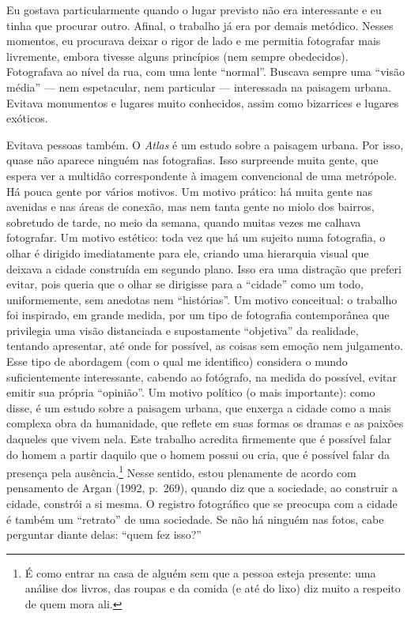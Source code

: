 Eu gostava particularmente quando o lugar previsto não era interessante
e eu tinha que procurar outro. Afinal, o trabalho já era por demais
metódico. Nesses momentos, eu procurava deixar o rigor de lado e me
permitia fotografar mais livremente, embora tivesse alguns princípios
(nem sempre obedecidos). Fotografava ao nível da rua, com uma lente
``normal''. Buscava sempre uma ``visão média'' --- nem espetacular, nem
particular --- interessada na paisagem urbana. Evitava monumentos e lugares
muito conhecidos, assim como bizarrices e lugares exóticos.

Evitava pessoas também. O \emph{Atlas} é um estudo sobre a paisagem
urbana. Por isso, quase não aparece ninguém nas fotografias. Isso
surpreende muita gente, que espera ver a multidão correspondente à
imagem convencional de uma metrópole. Há pouca gente por vários motivos.
Um motivo prático: há muita gente nas avenidas e nas áreas de conexão,
mas nem tanta gente no miolo dos bairros, sobretudo de tarde, no meio da
semana, quando muitas vezes me calhava fotografar. Um motivo estético:
toda vez que há um sujeito numa fotografia, o olhar é dirigido
imediatamente para ele, criando uma hierarquia visual que deixava a
cidade construída em segundo plano. Isso era uma distração que preferi
evitar, pois queria que o olhar se dirigisse para a ``cidade'' como um
todo, uniformemente, sem anedotas nem ``histórias''. Um motivo
conceitual: o trabalho foi inspirado, em grande medida, por um tipo de
fotografia contemporânea que privilegia uma visão distanciada e
supostamente ``objetiva'' da realidade, tentando apresentar, até onde
for possível, as coisas sem emoção nem julgamento. Esse tipo de
abordagem (com o qual me identifico) considera o mundo suficientemente
interessante, cabendo ao fotógrafo, na medida do possível, evitar emitir
sua própria ``opinião''. Um motivo político (o mais importante): como
disse, é um estudo sobre a paisagem urbana, que enxerga a cidade como a
mais complexa obra da humanidade, que reflete em suas formas os dramas e
as paixões daqueles que vivem nela. Este trabalho acredita firmemente
que é possível falar do homem a partir daquilo que o homem possui ou
cria, que é possível falar da presença pela ausência.\footnote{É como entrar na casa de alguém sem que a pessoa esteja
  presente: uma análise dos livros, das roupas e da comida (e até do
  lixo) diz muito a respeito de quem mora ali.} Nesse sentido, estou
plenamente de acordo com pensamento de Argan (1992, p.~269), quando diz que a sociedade, ao construir a cidade, constrói a si mesma. O registro fotográfico que se preocupa com
a cidade é também um ``retrato'' de uma sociedade. Se não há ninguém nas
fotos, cabe perguntar diante delas: ``quem fez isso?''

